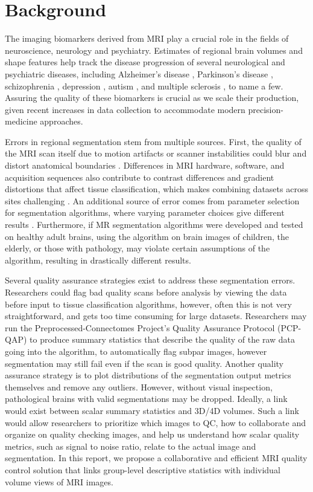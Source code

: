 \section{Background}


The imaging biomarkers derived from MRI play a crucial role in the fields of neuroscience, neurology and psychiatry. Estimates of regional brain volumes and shape features help track the disease progression of several neurological and psychiatric diseases, including Alzheimer's disease \cite{18632739,Vemuri_2010}, Parkinson's disease \cite{Silvia_Mangia_2013}, schizophrenia \cite{shenton2001review}, depression \cite{meisenzahl2011structural}, autism \cite{brambilla2003brain}, and multiple sclerosis \cite{Filippi_1995}, to name a few. Assuring the quality of these biomarkers is crucial as we scale their production, given recent increases in data collection to accommodate modern precision-medicine approaches. 

Errors in regional segmentation stem from multiple sources. First, the quality of the MRI scan itself due to motion artifacts or scanner instabilities could blur and distort anatomical boundaries \cite{Blumenthal_2002}. Differences in MRI hardware, software, and acquisition sequences also contribute to contrast differences and gradient distortions that affect tissue classification, which makes combining datasets across sites challenging \cite{keshavan2016power}. An additional source of error comes from parameter selection for segmentation algorithms, where varying parameter choices give different results \cite{Han_2006}. Furthermore, if MR segmentation algorithms were developed and tested on healthy adult brains, using the algorithm on brain images of children, the elderly, or those with pathology, may violate certain assumptions of the algorithm, resulting in drastically different results. 

Several quality assurance strategies exist to address these segmentation errors. Researchers could flag bad quality scans before analysis by viewing the data before input to tissue classification algorithms, however, often this is not very straightforward, and gets too time consuming for large datasets. Researchers may run the Preprocessed-Connectomes Project’s Quality Assurance Protocol (PCP-QAP)\cite{shehzadpreprocessed} to produce summary statistics that describe the quality of the raw data going into the algorithm, to automatically flag subpar images, however segmentation may still fail even if the scan is good quality. Another quality assurance strategy is to plot distributions of the segmentation output metrics themselves and remove any outliers. However, without visual inspection, pathological brains with valid segmentations may be dropped. Ideally, a link would exist between scalar summary statistics and 3D/4D volumes. Such a link would allow researchers to prioritize which images to QC, how to collaborate and organize on quality checking images, and help us understand how scalar quality metrics, such as signal to noise ratio, relate to the actual image and segmentation. In this report, we propose a collaborative and efficient MRI quality control solution that links group-level descriptive statistics with individual volume views of MRI images.  


